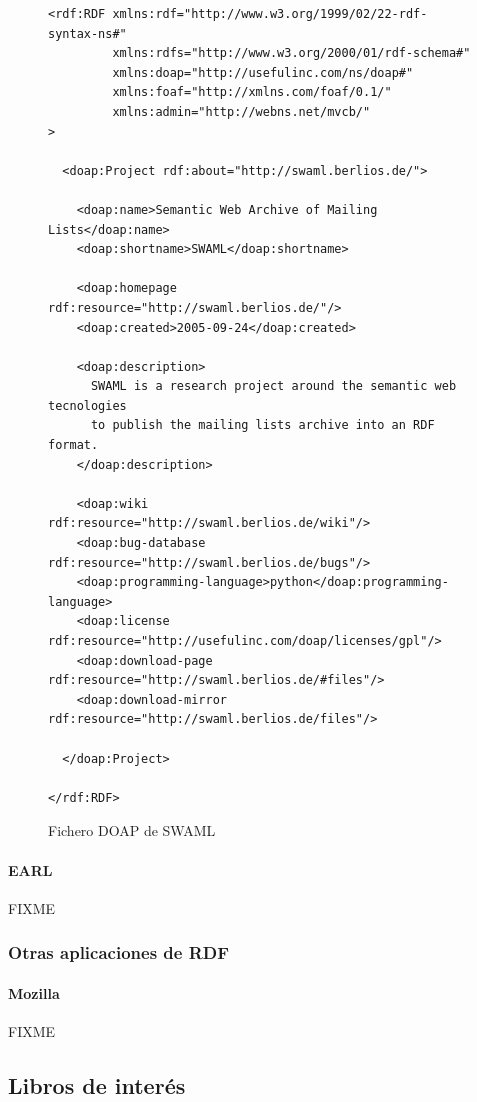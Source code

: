 \begin{figure}[H]
\lstset{language=XML}
\begin{lstlisting}
<rdf:RDF xmlns:rdf="http://www.w3.org/1999/02/22-rdf-syntax-ns#" 
         xmlns:rdfs="http://www.w3.org/2000/01/rdf-schema#" 
         xmlns:doap="http://usefulinc.com/ns/doap#" 
         xmlns:foaf="http://xmlns.com/foaf/0.1/" 
         xmlns:admin="http://webns.net/mvcb/" 
>

  <doap:Project rdf:about="http://swaml.berlios.de/">

    <doap:name>Semantic Web Archive of Mailing Lists</doap:name>
    <doap:shortname>SWAML</doap:shortname>

    <doap:homepage rdf:resource="http://swaml.berlios.de/"/>
    <doap:created>2005-09-24</doap:created>

    <doap:description>
      SWAML is a research project around the semantic web tecnologies 
      to publish the mailing lists archive into an RDF format.
    </doap:description>

    <doap:wiki rdf:resource="http://swaml.berlios.de/wiki"/>
    <doap:bug-database rdf:resource="http://swaml.berlios.de/bugs"/>
    <doap:programming-language>python</doap:programming-language>
    <doap:license rdf:resource="http://usefulinc.com/doap/licenses/gpl"/>
    <doap:download-page rdf:resource="http://swaml.berlios.de/#files"/>
    <doap:download-mirror rdf:resource="http://swaml.berlios.de/files"/>

  </doap:Project>

</rdf:RDF>
\end{lstlisting}
\caption{Fichero DOAP de SWAML}
\label{fig:ejemplo.doap}
\end{figure}

\paragraph{EARL}

FIXME

\subsubsection{Otras aplicaciones de RDF}

\paragraph{Mozilla}

FIXME

\subsection{Libros de interés}

